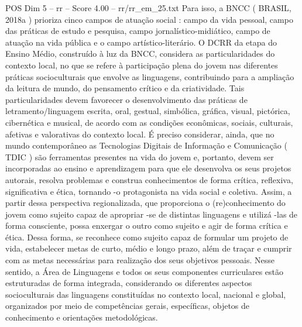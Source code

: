 \begin{textsample}{POS Dim 5 – rr – Score 4.00 – rr/rr\_em\_25.txt}
Para isso, a BNCC ( BRASIL, 2018a ) prioriza cinco campos de atuação social : campo da vida pessoal, campo das práticas de estudo e pesquisa, campo jornalístico-midiático, campo de atuação na vida pública e o campo artístico-literário.
O DCRR da etapa do Ensino Médio, construído à luz da BNCC, considera as particularidades do contexto local, no que se refere à participação plena do jovem nas diferentes práticas socioculturais que envolve as linguagens, contribuindo para a ampliação da leitura de mundo, do pensamento crítico e da criatividade.
Tais particularidades devem favorecer o desenvolvimento das práticas de letramento/linguagem escrita, oral, gestual, simbólica, gráfica, visual, pictórica, cibernética e musical, de acordo com as condições econômicas, sociais, culturais, afetivas e valorativas do contexto local.
É preciso considerar, ainda, que no mundo contemporâneo as Tecnologias Digitais de Informação e Comunicação ( TDIC ) são ferramentas presentes na vida do jovem e, portanto, devem ser incorporadas ao ensino e aprendizagem para que ele desenvolva os seus projetos autorais, resolva problemas e construa conhecimentos de forma crítica, reflexiva, significativa e ética, tornando -o protagonista na vida social e coletiva.
Assim, a partir dessa perspectiva regionalizada, que proporciona o (re)conhecimento do jovem como sujeito capaz de apropriar -se de distintas linguagens e utilizá -las de forma consciente, possa enxergar o outro como sujeito e agir de forma crítica e ética.
Dessa forma, se reconhece como sujeito capaz de formular um projeto de vida, estabelecer metas de curto, médio e longo prazo, além de traçar e cumprir com as metas necessárias para realização dos seus objetivos pessoais.
Nesse sentido, a Área de Linguagens e todos os seus componentes curriculares estão estruturadas de forma integrada, considerando os diferentes aspectos socioculturais das linguagens constituídas no contexto local, nacional e global, organizados por meio de competências gerais, específicas, objetos de conhecimento e orientações metodológicas.

\end{textsample}

